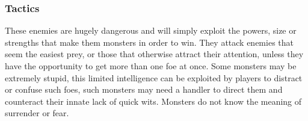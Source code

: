 \documentclass[a4paper,10pt,oneside]{book}
\newcommand{\textlf}[1]{\textbf{\titlecap{#1}}}
\begin{document}
\subsubsection{Tactics}
These enemies are hugely dangerous and will simply exploit the powers, size or strengths that make them monsters in order to win. They attack enemies that seem the easiest prey, or those that otherwise attract their attention, unless they have the opportunity to get more than one foe at once. Some monsters may be extremely stupid, this limited intelligence can be exploited by players to distract or confuse such foes, such monsters may need a handler to direct them and counteract their innate lack of quick wits. Monsters do not know the meaning of surrender or fear.

%
%
%
%
%
%
\end{document}
